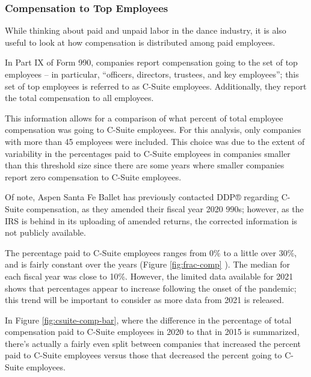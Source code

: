 \documentclass[Dance Data
Project,article,submit,moreauthors,pdftex]{mdpi}
\begin{document}
\newpage 

\hypertarget{compensation-to-top-employees}{%
\subsubsection{Compensation to Top
Employees}\label{compensation-to-top-employees}}

While thinking about paid and unpaid labor in the dance industry, it is
also useful to look at how compensation is distributed among paid
employees.

In Part IX of Form 990, companies report compensation going to the set
of top employees -- in particular, ``officers, directors, trustees, and
key employees''; this set of top employees is referred to as C-Suite
employees. Additionally, they report the total compensation to all
employees.

This information allows for a comparison of what percent of total
employee compensation was going to C-Suite employees. For this analysis,
only companies with more than 45 employees were included. This choice
was due to the extent of variability in the percentages paid to C-Suite
employees in companies smaller than this threshold size since there are
some years where smaller companies report zero compensation to C-Suite
employees.

Of note, Aspen Santa Fe Ballet has previously contacted DDP® regarding
C-Suite compensation, as they amended their fiscal year 2020 990s;
however, as the IRS is behind in its uploading of amended returns, the
corrected information is not publicly available.

The percentage paid to C-Suite employees ranges from 0\% to a little
over 30\%, and is fairly constant over the years (Figure
\ref{fig:frac-comp} ). The median for each fiscal year was close to
10\%. However, the limited data available for 2021 shows that
percentages appear to increase following the onset of the pandemic; this
trend will be important to consider as more data from 2021 is released.

In Figure \ref{fig:csuite-comp-bar}, where the difference in the
percentage of total compensation paid to C-Suite employees in 2020 to
that in 2015 is summarized, there's actually a fairly even split between
companies that increased the percent paid to C-Suite employees versus
those that decreased the percent going to C-Suite employees.
\end{document}
